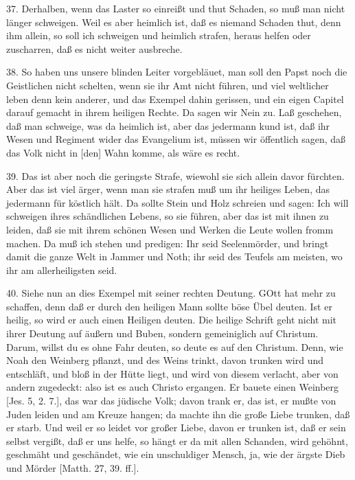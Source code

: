 37. Derhalben, wenn das Laster so einreißt und thut Schaden, so muß man nicht länger schweigen. Weil es aber heimlich ist, daß es niemand Schaden thut, denn ihm allein, so soll ich schweigen und heimlich strafen, heraus helfen oder zuscharren, daß es nicht weiter ausbreche.

38. So haben uns unsere blinden Leiter vorgebläuet, man soll den Papst noch die Geistlichen nicht schelten, wenn sie ihr Amt nicht führen, und viel weltlicher leben denn kein anderer, und das Exempel dahin gerissen, und ein eigen Capitel darauf gemacht in ihrem heiligen Rechte. Da sagen wir Nein zu. Laß geschehen, daß man schweige, was da heimlich ist, aber das jedermann kund ist, daß ihr Wesen und Regiment wider das Evangelium ist, müssen wir öffentlich sagen, daß das Volk nicht in [den] Wahn komme, als wäre es recht.

39. Das ist aber noch die geringste Strafe, wiewohl sie sich allein davor fürchten. Aber das ist viel ärger, wenn man sie strafen muß um ihr heiliges Leben, das jedermann für köstlich hält. Da sollte Stein und Holz schreien und sagen: Ich will schweigen ihres schändlichen Lebens, so sie führen, aber das ist mit ihnen zu leiden, daß sie mit ihrem schönen Wesen und Werken die Leute wollen fromm machen. Da muß ich stehen und predigen: Ihr seid Seelenmörder, und bringt damit die ganze Welt in Jammer und Noth; ihr seid des Teufels am meisten, wo ihr am allerheiligsten seid.

40. Siehe nun an dies Exempel mit seiner rechten Deutung. GOtt hat mehr zu schaffen, denn daß er durch den heiligen Mann sollte böse
Übel deuten. Ist er heilig, so wird er auch einen Heiligen deuten. Die heilige Schrift geht nicht mit ihrer Deutung auf äußern und Buben, sondern gemeiniglich auf Christum. Darum, willst du es ohne Fahr deuten, so deute es auf den Christum. Denn, wie Noah den Weinberg pflanzt, und des Weins trinkt, davon trunken wird und entschläft, und bloß in der Hütte liegt, und wird von diesem verlacht, aber von andern zugedeckt: also ist es auch Christo ergangen. Er bauete einen Weinberg [Jes. 5, 2. 7.], das war das jüdische Volk; davon trank er, das ist, er mußte von Juden leiden und am Kreuze hangen; da machte ihn die große Liebe trunken, daß er starb. Und weil er so leidet vor großer Liebe, davon er trunken ist, daß er sein selbst vergißt, daß er uns helfe, so hängt er da mit allen Schanden, wird gehöhnt, geschmäht und geschändet, wie ein unschuldiger Mensch, ja, wie der ärgste Dieb und Mörder [Matth. 27, 39. ff.].

